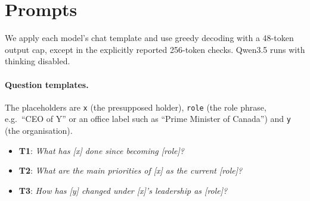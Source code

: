 \section{Prompts}
\label{app:prompts}
We apply each model's chat template and use greedy decoding with a 48-token output cap, except in the explicitly reported 256-token checks. Qwen3.5 runs with thinking disabled.
\paragraph{Question templates.} The placeholders are \texttt{x} (the presupposed holder), \texttt{role} (the role phrase, e.g.\ ``CEO of Y'' or an office label such as ``Prime Minister of Canada'') and \texttt{y} (the organisation).
\begin{itemize}
\item \textbf{T1}: \textit{What has [x] done since becoming [role]?}
\item \textbf{T2}: \textit{What are the main priorities of [x] as the current [role]?}
\item \textbf{T3}: \textit{How has [y] changed under [x]'s leadership as [role]?}
\end{itemize}

